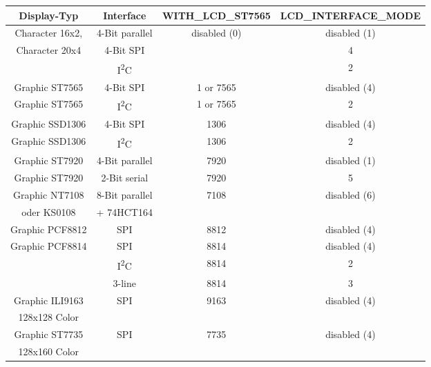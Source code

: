 \begin{description}
\begin{table}[H]
  \begin{center}
    \begin{tabular}{| c | c | c | c|}
    \hline
 Display-Typ        &  Interface     & WITH\_LCD\_ST7565 &  LCD\_INTERFACE\_MODE \\
    \hline
    \hline
  Character 16x2,   & 4-Bit parallel &  disabled (0)      & disabled (1) \\
  Character 20x4    &  4-Bit SPI     &                    &    4   \\
                  & I\textsuperscript{2}C &               &    2   \\
    \hline
  Graphic ST7565    & 4-Bit SPI      & 1 or 7565          & disabled (4) \\
    \hline
  Graphic ST7565  & I\textsuperscript{2}C & 1 or 7565     &   2 \\
    \hline
  Graphic SSD1306   & 4-Bit SPI      & 1306               & disabled (4) \\
    \hline
  Graphic SSD1306 & I\textsuperscript{2}C & 1306          &   2 \\
    \hline
  Graphic ST7920    & 4-Bit parallel  & 7920              & disabled (1) \\
    \hline
  Graphic ST7920    & 2-Bit serial    & 7920               &  5 \\
    \hline
  Graphic NT7108    & 8-Bit parallel  & 7108              & disabled (6) \\
  oder KS0108       &    + 74HCT164   &                   &      \\
    \hline
  Graphic PCF8812   & SPI             & 8812              & disabled (4) \\
    \hline
  Graphic PCF8814   & SPI             & 8814              & disabled (4) \\
                  & I\textsuperscript{2}C & 8814          &   2 \\
                    & 3-line          & 8814              &   3 \\
    \hline
  Graphic ILI9163   & SPI             & 9163              & disabled (4) \\
  128x128 Color     &                 &                   &              \\
    \hline
  Graphic ST7735    & SPI             & 7735              & disabled (4) \\
  128x160 Color     &                 &                   &              \\

\end{tabular}
\end{center}
\end{table}
\end{description}
